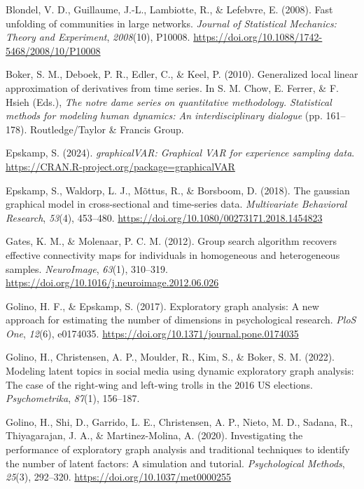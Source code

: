 \documentclass[
]{article}
\newlength{\cslhangindent}
\newenvironment{CSLReferences}[2] %
 {\begin{list}{}{%
  \setlength{\itemindent}{0pt}
  \setlength{\leftmargin}{0pt}
  \setlength{\parsep}{0pt}
  \ifodd #1
   \setlength{\leftmargin}{\cslhangindent}
   \setlength{\itemindent}{-1\cslhangindent}
  \fi
  \setlength{\itemsep}{#2\baselineskip}}}
 {\end{list}}
\begin{document}
\label{refs}
\begin{CSLReferences}{1}{0}
Blondel, V. D., Guillaume, J.-L., Lambiotte, R., \& Lefebvre, E. (2008).
Fast unfolding of communities in large networks. \emph{Journal of
Statistical Mechanics: Theory and Experiment}, \emph{2008}(10), P10008.
\url{https://doi.org/10.1088/1742-5468/2008/10/P10008}

Boker, S. M., Deboek, P. R., Edler, C., \& Keel, P. (2010). Generalized
local linear approximation of derivatives from time series. In S. M.
Chow, E. Ferrer, \& F. Hsieh (Eds.), \emph{The notre dame series on
quantitative methodology. Statistical methods for modeling human
dynamics: An interdisciplinary dialogue} (pp. 161--178).
Routledge/Taylor \& Francis Group.

Epskamp, S. (2024). \emph{graphicalVAR: Graphical VAR for experience
sampling data}. \url{https://CRAN.R-project.org/package=graphicalVAR}

Epskamp, S., Waldorp, L. J., Mõttus, R., \& Borsboom, D. (2018). The
gaussian graphical model in cross-sectional and time-series data.
\emph{Multivariate Behavioral Research}, \emph{53}(4), 453--480.
\url{https://doi.org/10.1080/00273171.2018.1454823}

Gates, K. M., \& Molenaar, P. C. M. (2012). Group search algorithm
recovers effective connectivity maps for individuals in homogeneous and
heterogeneous samples. \emph{NeuroImage}, \emph{63}(1), 310--319.
\url{https://doi.org/10.1016/j.neuroimage.2012.06.026}

Golino, H. F., \& Epskamp, S. (2017). Exploratory graph analysis: A new
approach for estimating the number of dimensions in psychological
research. \emph{PloS One}, \emph{12}(6), e0174035.
\url{https://doi.org/10.1371/journal.pone.0174035}

Golino, H., Christensen, A. P., Moulder, R., Kim, S., \& Boker, S. M.
(2022). Modeling latent topics in social media using dynamic exploratory
graph analysis: The case of the right-wing and left-wing trolls in the
2016 US elections. \emph{Psychometrika}, \emph{87}(1), 156--187.

Golino, H., Shi, D., Garrido, L. E., Christensen, A. P., Nieto, M. D.,
Sadana, R., Thiyagarajan, J. A., \& Martinez-Molina, A. (2020).
Investigating the performance of exploratory graph analysis and
traditional techniques to identify the number of latent factors: A
simulation and tutorial. \emph{Psychological Methods}, \emph{25}(3),
292--320. \url{https://doi.org/10.1037/met0000255}


\end{CSLReferences}
\end{document}
